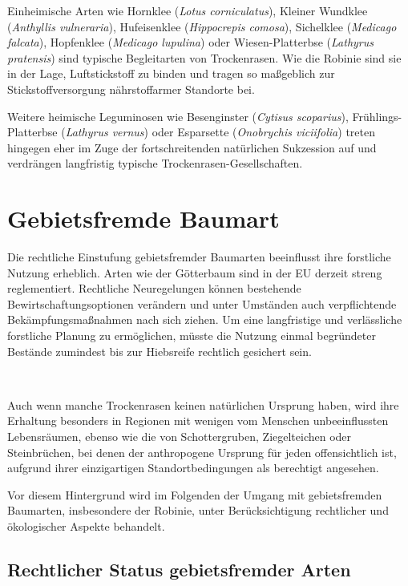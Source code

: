 \documentclass[twocolumn]{scrartcl}
\makeatletter
\newcommand{\summary}[1]{%
  \par %
  {\small\sffamily
    \noindent #1\par}
  \vspace{-0.4em}
  \noindent\makebox[\linewidth]{\rule{0.33\linewidth}{0.4pt}}\\[-1.2em]
  \@afterindentfalse\@afterheading
}
\makeatother
\begin{document}
Einheimische Arten wie Hornklee (\emph{Lotus corniculatus}), Kleiner
Wundklee (\emph{Anthyllis vulneraria}), Hufeisenklee
(\emph{Hippocrepis comosa}), Sichelklee (\emph{Medicago falcata}),
Hopfenklee (\emph{Medicago lupulina}) oder Wiesen-Platterbse
(\emph{Lathyrus pratensis}) sind typische Begleitarten von
Trockenrasen. Wie die Robinie sind sie in der Lage, Luftstickstoff zu
binden und tragen so maßgeblich zur Stickstoffversorgung
nährstoffarmer Standorte bei.

Weitere heimische Leguminosen wie Besenginster (\emph{Cytisus
scoparius}), Frühlings-Platterbse (\emph{Lathyrus vernus}) oder
Esparsette (\emph{Onobrychis viciifolia}) treten hingegen eher im Zuge
der fortschreitenden natürlichen Sukzession auf und verdrängen
langfristig typische Trockenrasen-Gesellschaften.


\section{Gebietsfremde Baumart}

\summary{Die rechtliche Einstufung gebietsfremder Baumarten
  beeinflusst ihre forstliche Nutzung erheblich. Arten wie der
  Götterbaum sind in der EU derzeit streng reglementiert. Rechtliche
  Neuregelungen können bestehende Bewirtschaftungsoptionen verändern
  und unter Umständen auch verpflichtende Bekämpfungsmaßnahmen nach
  sich ziehen. Um eine langfristige und verlässliche forstliche
  Planung zu ermöglichen, müsste die Nutzung einmal begründeter
  Bestände zumindest bis zur Hiebsreife rechtlich gesichert sein.}

Auch wenn manche Trockenrasen keinen natürlichen Ursprung haben, wird
ihre Erhaltung besonders in Regionen mit wenigen vom Menschen
unbeeinflussten Lebensräumen, ebenso wie die von Schottergruben,
Ziegelteichen oder Steinbrüchen, bei denen der anthropogene Ursprung
für jeden offensichtlich ist, aufgrund ihrer einzigartigen
Standortbedingungen als berechtigt angesehen.

Vor diesem Hintergrund wird im Folgenden der Umgang mit gebietsfremden
Baumarten, insbesondere der Robinie, unter Berücksichtigung
rechtlicher und ökologischer Aspekte behandelt.


\subsection{Rechtlicher Status gebietsfremder Arten}%
\end{document}

